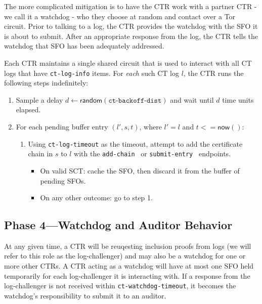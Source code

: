 The more complicated mitigation is to have the CTR work with a partner CTR - we call it
a watchdog - who they choose at random and contact over a Tor circuit. Prior to talking
to a log, the CTR provides the watchdog with the SFO it is about to submit. After
an appropriate response from the log, the CTR tells the watchdog that SFO has been
adequately addressed.  

Each CTR maintains a single shared circuit that is used to interact with all CT
logs that have \texttt{ct-log-info} items. For \emph{each} such CT log $l$, the
CTR runs the following steps indefinitely:
\begin{enumerate}
    \item\label{enm:auditing:backoff} Sample a delay $d \gets
        \mathsf{random}(\texttt{ct-backoff-dist})$ and wait until $d$ time units
        elapsed.
    \item\label{enm:auditing:loop} For each pending buffer entry $(l',s,t)$,
    where $l' = l$ and $t <= \mathsf{now}()$:
        \begin{enumerate}
            \item\label{enm:auditing:add-chain} Using \texttt{ct-log-timeout} as
                the timeout, attempt to add the certificate chain in $s$ to $l$
                with the \texttt{add-chain}~\cite{ct} or
                \texttt{submit-entry}~\cite{ct/bis} endpoints.
                \begin{itemize}
                    \item\label{enm:auditing:add-chain:success} On valid
                        SCT: cache the SFO, then discard it from the buffer of
                        pending SFOs.
                    \item\label{enm:auditing:add-chain:fail} On any other
                        outcome: go to step 1.
                \end{itemize}
        \end{enumerate}
\end{enumerate}

\subsection{Phase 4---Watchdog and Auditor Behavior}

At any given time, a CTR will be reuqesting inclusion proofs from logs (we will refer to this role as the log-challenger) and may also be a watchdog for one or more other CTRs. A CTR acting as a watchdog will have at most one SFO held temporarily for each log-challenger it is interacting with. If a response from the log-challenger is not received within \texttt{ct-watchdog-timeout}, it becomes the watchdog's responsibility to submit it to an auditor.

